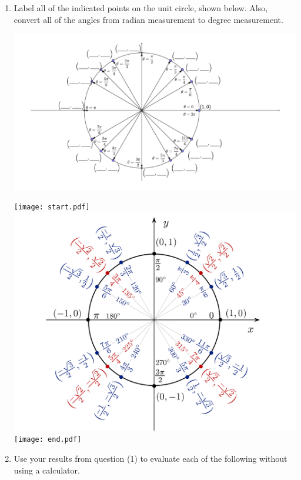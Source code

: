 \documentclass[12pt]{article}
\begin{document}
\begin{enumerate}

\item Label all of the indicated points on the unit circle, shown below.  Also, convert all of the angles from radian measurement to degree measurement.

\begin{center}
\includegraphics[scale=0.8]{unitcircle4.pdf}
\end{center}

\texttt{[image: start.pdf]}
{{\includegraphics[scale=0.5]{unit_circle.pdf}}}
\texttt{[image: end.pdf]}


\newpage

\item Use your results from question (1) to evaluate each of the following without using a calculator.

\begin{enumerate}


\end{enumerate}
\end{enumerate}
\end{document}
